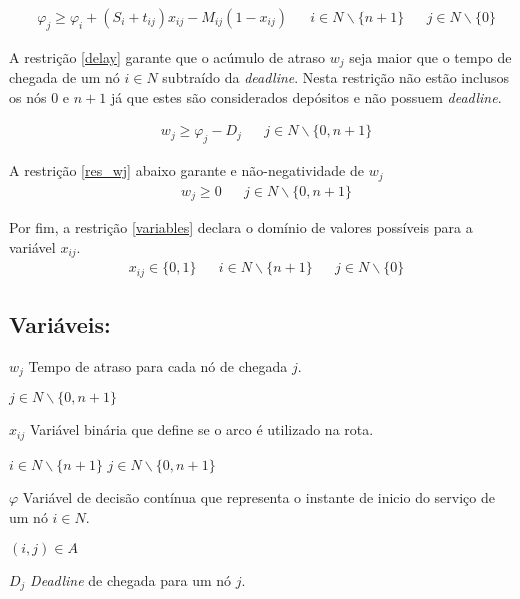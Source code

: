 \documentclass[12pt]{article}
\begin{document}
\begin{align}
   & \varphi_j \geq \varphi_i + (S_i + t_{ij})x_{ij} - M_{ij}(1-x_{ij}) &  & i\in N\backslash \{n+1\} &  & j\in N\backslash \{0\} \label{sub-routes}
\end{align}

A restrição \eqref{delay} garante que o acúmulo de atraso $w_j$ seja maior que
o tempo de chegada de um nó $i \in N$ subtraído da {\it deadline}. Nesta
restrição não estão inclusos os nós $0$ e $n+1$ já que estes são considerados
depósitos e não possuem {\it deadline}.

\begin{align}
   & w_j \geq \varphi_j - D_j & \label{delay} & j\in N\backslash \{0,n+1\}
\end{align}

A restrição \eqref{res_wj} abaixo garante e não-negatividade de $w_j$
\begin{align}
   & w_j \geq 0 &  & j\in N\backslash \{0,n+1\} \label{res_wj}
\end{align}

Por fim, a restrição \eqref{variables} declara o domínio de valores possíveis
para a variável $x_{ij}$.
\begin{align}
   & x_{ij} \in \{0,1\} &  & i\in N\backslash \{n+1\} &  & j\in N\backslash \{0\}  \label{variables}
\end{align}

\subsection{Variáveis:}

\hspace{1.27cm}$w_j$ Tempo de atraso para cada nó de chegada $j$.

\hspace{1.27cm} $j\in N\backslash \{0,n+1\}$

$x_{ij}$ Variável binária que define se o arco é utilizado na rota.

\hspace{1.27cm} $i\in N\backslash \{n+1\}$ \hspace{1.27cm}  $j\in N\backslash \{0,n+1\}$

$\varphi$ Variável de decisão contínua que representa o instante de inicio do serviço de um nó $i\in N$.

\hspace{1.27cm} $(i,j) \in A$

$D_j$ {\it Deadline} de chegada para um nó $j$.
\end{document}
